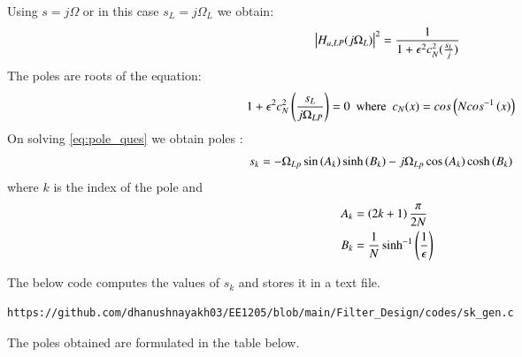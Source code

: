 \documentclass{article}
\begin{document}
\begin{enumerate}
Using $s=j\Omega$ or in this case $s_{L}=j\Omega_{L}$ we obtain:
\begin{align}
    \left\vert H_{a,LP}(j\Omega_L)\right\vert^2 = \frac{1}{1 + \epsilon^2c_N^2(\frac{s_L}{j})}
\end{align}
The poles are roots of the equation:
\begin{align}
    {1 + \epsilon^2c_N^2\ensuremath{\left(\frac{s_L}{j\Omega_{LP}}\right)}} &=0\hspace{5pt}\text{where}\hspace{5pt} c_N(x) = cos\left(Ncos^{-1}\left(x\right)\right) \label{eq:pole_ques}
\end{align}
On solving \eqref{eq:pole_ques} we obtain poles :
\begin{align}
    s_{k} &= -\Omega_{Lp} \sin\left(A_k\right)\sinh\left(B_k\right) - j\Omega_{Lp}\cos\left(A_k\right)\cosh\left(B_k\right)
\end{align}
where $k$ is the index of the pole and \\
\begin{align}
    A_k &= \left(2k+1\right)\frac{\pi}{2N}\\
    B_k &= \frac{1}{N} \sinh^{-1}\left(\frac{1}{\epsilon}\right)
\end{align}

The below code computes the values of $s_k$ and stores it in a text file.
\begin{lstlisting}
https://github.com/dhanushnayakh03/EE1205/blob/main/Filter_Design/codes/sk_gen.c
\end{lstlisting}
The poles obtained are formulated in the table below.



\end{enumerate}
\end{document}
